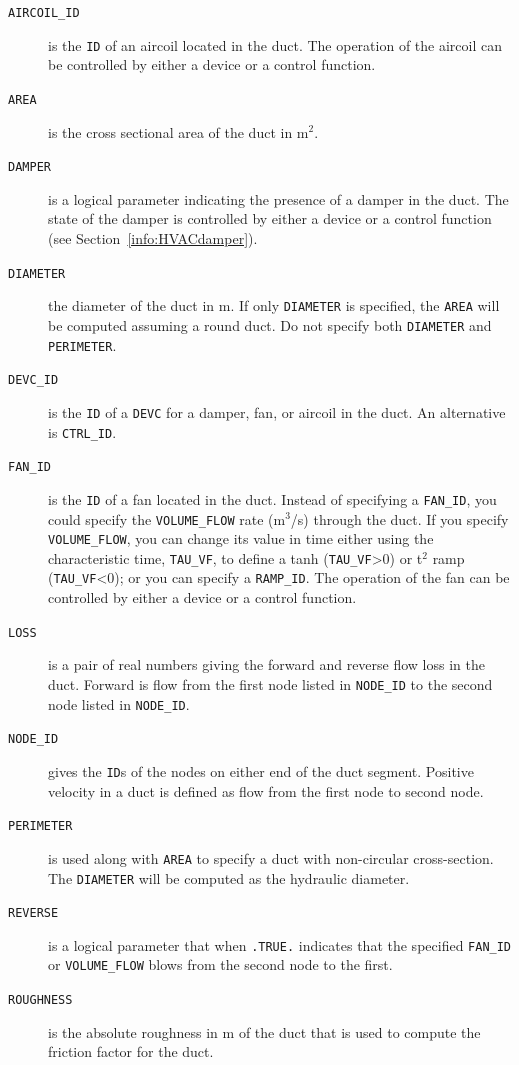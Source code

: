\documentclass[11pt]{book}
\newcommand{\ct}{\tt\small}
\begin{document}
\begin{description}
\item[{\ct AIRCOIL\_ID}] is the {\ct ID} of an aircoil located in the duct.  The operation of the aircoil can be controlled by either a device or a control function.
\item[{\ct AREA}] is the cross sectional area of the duct in m$^2$.
\item[{\ct DAMPER}] is a logical parameter indicating the presence of a damper in the duct. The state of the damper is controlled by either a device or a control function (see Section~\ref{info:HVACdamper}).
\item[{\ct DIAMETER}] the diameter of the duct in m.  If only {\ct DIAMETER} is specified, the {\ct AREA} will be computed assuming a round duct.  Do not specify both {\ct DIAMETER} and {\ct PERIMETER}.
\item[{\ct DEVC\_ID}]  is the {\ct ID} of a {\ct DEVC} for a damper, fan, or aircoil in the duct. An alternative is {\ct CTRL\_ID}.
\item[{\ct FAN\_ID}] is the {\ct ID} of a fan located in the duct. Instead of
specifying a {\ct FAN\_ID}, you could specify the {\ct VOLUME\_FLOW} rate (m$^3$/s) through the duct. If you specify {\ct VOLUME\_FLOW}, you can change its value in time either using the characteristic time, {\ct TAU\_VF},  to define a tanh ({\ct TAU\_VF}>0) or t$^2$ ramp ({\ct TAU\_VF}<0); or you can specify a {\ct RAMP\_ID}.  The operation of the fan can be controlled by either a device or a control function.
\item[{\ct LOSS}] is a pair of real numbers giving the forward and reverse flow loss in the duct.  Forward is flow from the first node listed in {\ct NODE\_ID} to the second node listed in {\ct NODE\_ID}.
\item[{\ct NODE\_ID}] gives the {\ct ID}s of the nodes on either end of the duct segment.  Positive velocity in a duct is defined as flow from the first node to second node.
\item[{\ct PERIMETER}] is used along with {\ct AREA} to specify a duct with non-circular cross-section.  The {\ct DIAMETER} will be computed as the hydraulic diameter.
\item[{\ct REVERSE}]  is a logical parameter that when {\ct .TRUE.} indicates that the specified {\ct FAN\_ID} or {\ct VOLUME\_FLOW} blows from the second node to the first.
\item[{\ct ROUGHNESS}] is the absolute roughness in m of the duct that is used to compute the friction factor for the duct.
\end{description}
\end{document}
